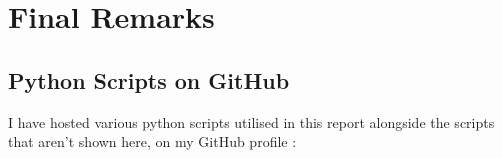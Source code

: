 \section{Final Remarks}
\subsection{Python Scripts on GitHub}
I have hosted various python scripts utilised in this report alongside the scripts that aren't shown here, on my GitHub profile :  
